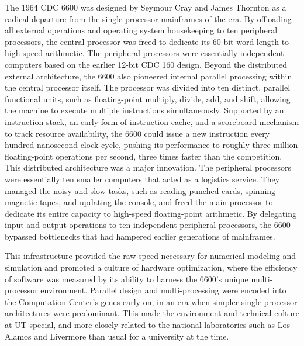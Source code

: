 The 1964 CDC 6600 was designed by Seymour Cray and James Thornton as a radical departure from the single-processor mainframes of the era. By offloading all external operations and operating system housekeeping to ten peripheral processors, the central processor was freed to dedicate its 60-bit word length to high-speed arithmetic. The peripheral processors were essentially independent computers based on the earlier 12-bit CDC 160 design. Beyond the distributed external architecture, the 6600 also pioneered internal parallel processing within the central processor itself. The processor was divided into ten distinct, parallel functional units, such as floating-point multiply, divide, add, and shift, allowing the machine to execute multiple instructions simultaneously. Supported by an instruction stack, an early form of instruction cache, and a scoreboard mechanism to track resource availability, the 6600 could issue a new instruction every hundred nanosecond clock cycle, pushing its performance to roughly three million floating-point operations per second, three times faster than the competition. This distributed architecture was a major innovation. The peripheral processors were essentially ten smaller computers that acted as a logistics service. They managed the noisy and slow tasks, such as reading punched cards, spinning magnetic tapes, and updating the console, and freed the main processor to dedicate its entire capacity to high-speed floating-point arithmetic. By delegating input and output operations to ten independent peripheral processors, the 6600 bypassed bottlenecks that had hampered earlier generations of mainframes.

This infrastructure provided the raw speed necessary for numerical modeling and simulation and promoted a culture of hardware optimization, where the efficiency of software was measured by its ability to harness the 6600’s unique multi-processor environment. Parallel design and multi-processing were encoded into the Computation Center’s genes early on, in an era when simpler single-processor architectures were predominant. This made the environment and technical culture at UT special, and more closely related to the national laboratories such as Los Alamos and Livermore than usual for a university at the time.

